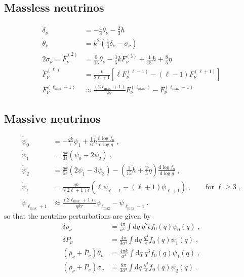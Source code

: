 \documentclass[a4paper]{article}
\newcommand{\dd}{\mathrm{d}}
\begin{document}
\subsection{Massless neutrinos}
\begin{align}
  \dot{\delta}_\nu &= -\frac{4}{3}\theta_\nu - \frac{2}{3}\dot{h} \\
  \dot{\theta}_\nu &= k^2\left( \frac{1}{4}\delta_\nu - \sigma_\nu \right) \\ 
  2 \dot{\sigma}_\nu = \dot{F}_{\nu}^{(2)} &= \frac{8}{15}\theta_\nu - \frac{3}{5}k F_{\nu}^{(3)} + \frac{4}{15} \dot{h} + \frac{8}{5} \dot{\eta}\\
  \dot{F}_{\nu}^{(\ell)} &= \frac{k}{2\ell+1}\left[\ell F_{\nu}^{(\ell-1)}-(\ell-1)F_{\nu}^{(\ell+1)}\right] \\
  F_{\nu}^{(\ell_\text{max}+1)} &\approx \frac{(2\ell_\text{max}+1)}{k\tau} F_{\nu}^{(\ell_\text{max})} - F_{\nu}^{(\ell_\text{max}-1)}  
\end{align}

\subsection{Massive neutrinos}
\begin{align}
  \dot{\psi}_0 &= -\frac{qk}{\epsilon}\psi_1 + \frac{1}{6}\dot{h}\frac{\dd \log f_0}{\dd \log q}\;, \\
  \dot{\psi}_1 &= \frac{qk}{3\epsilon}\left(\psi_0 - 2\psi_2\right)\;,\\
  \dot{\psi}_2 &= \frac{qk}{5\epsilon}\left(2\psi_1 - 3\psi_3\right) - \left(\frac{1}{15}\dot{h} + \frac{2}{5}\dot{\eta}\right)\frac{\dd \log f_0}{\dd \log q}\;,\\
  \dot{\psi}_\ell &= \frac{qk}{(2\ell+1)\epsilon}\left(\ell\psi_{\ell-1} - (\ell+1)\psi_{\ell+1}\right)\;,\qquad\text{for $\ell\ge3$}\;,\\
  \psi_{\ell_\text{max}+1} &\approx \frac{(2\ell_\text{max}+1)\epsilon}{qk\tau} \psi_{\ell_\text{max}} - \psi_{\ell_\text{max}-1}\;.
\end{align}
so that the neutrino perturbations are given by
\begin{align}
  \delta\rho_\nu &= \frac{4\pi}{a^4}\int \dd q\;q^2\epsilon f_0(q)\psi_0(q)\;,\\
  \delta P_\nu &= \frac{4\pi}{3a^4}\int \dd q\;\frac{q^4}{\epsilon} f_0(q)\psi_1(q)\;,\\
  (\overline{\rho}_\nu+\overline{P}_\nu)\theta_\nu &= \frac{4\pi k}{a^4}\int \dd q\;q^3 f_0(q)\psi_1(q)\;,\\
  (\overline{\rho}_\nu+\overline{P}_\nu)\sigma_\nu &= \frac{8\pi}{3a^4}\int \dd q\;\frac{q^4}{\epsilon} f_0(q)\psi_2(q)\;.
\end{align}
\end{document}
